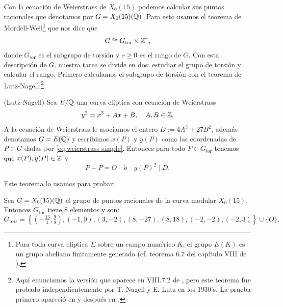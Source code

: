 \documentclass[../../tesis_maestria]{subfiles}
\begin{document}
Con la ecuación de Weierstrass de $X_0(15)$ podemos calcular sus puntos racionales que denotamos por $G=X_0(15)(\mathbb{Q})$. Para esto usamos el teorema de Mordell-Weil\footnote{Para toda curva elíptica $E$ sobre un campo numérico $K$, el grupo $E(K)$ es un grupo abeliano finitamente generado (cf. teorema 6.7 del capítulo VIII de \cite{SilvermanTAOEC}).} que nos dice que
\[
	G\cong G_{\mathrm{tor}}\times\mathbb{Z}^r,
\]
donde $G_{\mathrm{tor}}$ es el subgrupo de torsión y $r\geq0$ es el rango de $G$. Con esta descripción de $G$, nuestra tarea se divide en dos: estudiar el grupo de torsión y calcular el rango. Primero calculamos el subgrupo de torsión con el teorema de Lutz-Nagell:\footnote{Aquí enunciamos la versión que aparece en VIII.7.2 de \cite{SilvermanTAOEC}, pero este teorema fue probado independientemente por T. Nagell y E. Lutz en los 1930's. La prueba primero apareció en \cite{Nagell} y después en \cite{Lutz}.}

\begin{thm}(Lutz-Nagell)\label{thm:Lutz-Nagelll}
	Sea $E/\mathbb{Q}$ una curva elíptica con ecuación de Weierstrass
	\begin{equation}\label{eq:weierstrass-simple}
		y^2=x^3+Ax+B,\quad A,B\in\mathbb{Z}.
	\end{equation}
A la ecuación de Weierstrass le asociamos el entero $D:=4A^3+27B^2$, además denotamos $G=E(\mathbb{Q})$ y escribimos $x(P)$ y $y(P)$ como las coordenadas de $P\in G$ dadas por \eqref{eq:weierstrass-simple}. Entonces para todo $P\in G_{\mathrm{tor}}$ tenemos que $x(P),y(P)\in\mathbb{Z}$ y
\[
	P+P=O\quad\acute{o}\quad y(P)^2\mid D.
\]
\end{thm}

Este teorema lo usamos para probar:

\begin{prop}\label{prop:grupo-torsion-x15}
	Sea $G=X_0(15)(\mathbb{Q})$ el grupo de puntos racionales de la curva modular $X_0(15)$. Entonces $G_\mathrm{tor}$ tiene 8 elementos y son:
	\[
		G_\mathrm{tors}=
		\left\{ \left(-\tfrac{13}{4},\tfrac{9}{8}\right),(-1,0),(3,-2),(8,-27),(8,18),(-2,-2),(-2,3) \right\}\cup\{O\}.
	\]
\end{prop}
\end{document}
